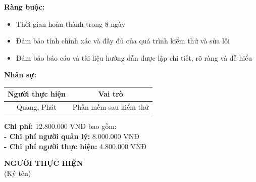 {\begin{minipage}{\textwidth}
        \noindent \textbf{Ràng buộc:}
        \begin{itemize}
            \item Thời gian hoàn thành trong 8 ngày
            \item Đảm bảo tính chính xác và đầy đủ của quá trình kiểm thử và sửa lỗi
            \item Đảm bảo báo cáo và tài liệu hướng dẫn được lập chi tiết, rõ ràng và dễ hiểu
        \end{itemize}
        \noindent \textbf{Nhân sự:}
        \begin{longtable}{|c|c|}
        \hline
        \textbf{Người thực hiện} & \textbf{Vai trò} \\
        \hline
        Quang, Phát & Phần mềm sau kiểm thử \\
        \hline
        \end{longtable}
        \noindent \textbf{Chi phí:} 12.800.000 VNĐ bao gồm:\\
        \noindent \textbf{  - Chi phí người quản lý:} 8.000.000 VNĐ \\
        \noindent \textbf{  - Chi phí người thực hiện:} 4.800.000 VNĐ \\
        \begin{flushleft}
            \hspace{8cm} \textbf{NGƯỜI THỰC HIỆN} \\
            \hspace{9.5cm} (Ký tên) \\
        \end{flushleft}
	\end{minipage}
}    
